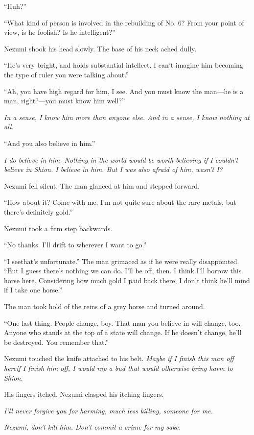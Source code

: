 ``\el Huh?''

``What kind of person is involved in the rebuilding of No. 6? From your
point of view, is he foolish? Is he intelligent?''

Nezumi shook his head slowly. The base of his neck ached dully.

``He's very bright, and holds substantial intellect. I can't imagine him
becoming the type of ruler you were talking about.''

``Ah, you have high regard for him, I see. And you must know the man---he
is a man, right?---you must know him well?''

\emph{In a sense, I know him more than anyone else. And in a sense, I know
nothing at all.}

``And you also believe in him.''

\emph{I do believe in him. Nothing in the world would be worth believing if I
couldn't believe in Shion. I believe in him. But I was also afraid of
him, wasn't I?}

Nezumi fell silent. The man glanced at him and stepped forward.

``How about it? Come with me. I'm not quite sure about the rare metals,
but there's definitely gold.''

Nezumi took a firm step backwards.

``No thanks. I'll drift to wherever I want to go.''

``I see\el that's unfortunate.'' The man grimaced as if he were really
disappointed. ``But I guess there's nothing we can do. I'll be off,
then. I think I'll borrow this horse here. Considering how much gold I
paid back there, I don't think he'll mind if I take one horse.''

The man took hold of the reins of a grey horse and turned around.

``One last thing. People change, boy. That man you believe in will
change, too. Anyone who stands at the top of a state will change. If he
doesn't change, he'll be destroyed. You remember that.''

Nezumi touched the knife attached to his belt. \emph{Maybe if I finish this
man off here\el if I finish him off, I would nip a bud that would
otherwise bring harm to Shion.}

His fingers itched. Nezumi clasped his itching fingers.

\emph{I'll never forgive you for harming, much less killing, someone for me.}

\emph{Nezumi, don't kill him. Don't commit a crime for my sake.}

